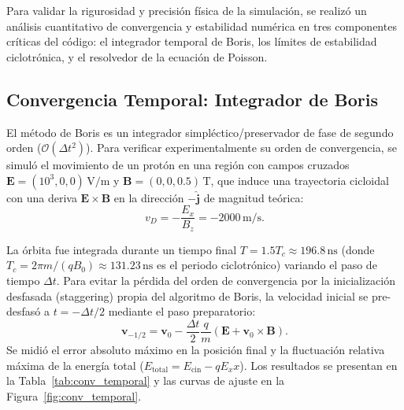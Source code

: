 \documentclass[11pt]{article}
\begin{document}
Para validar la rigurosidad y precisión física de la simulación, se realizó un análisis cuantitativo de convergencia y estabilidad numérica en tres componentes críticas del código: el integrador temporal de Boris, los límites de estabilidad ciclotrónica, y el resolvedor de la ecuación de Poisson.

\subsection{Convergencia Temporal: Integrador de Boris}

El método de Boris es un integrador simpléctico/preservador de fase de segundo orden ($\mathcal{O}(\Delta t^2)$). Para verificar experimentalmente su orden de convergencia, se simuló el movimiento de un protón en una región con campos cruzados $\mathbf{E} = (10^3, 0, 0)\,\text{V/m}$ y $\mathbf{B} = (0, 0, 0.5)\,\text{T}$, que induce una trayectoria cicloidal con una deriva $\mathbf{E} \times \mathbf{B}$ en la dirección $-\hat{\mathbf{j}}$ de magnitud teórica:
\begin{equation}
  v_D = -\frac{E_x}{B_z} = -2000\,\text{m/s}.
\end{equation}

La órbita fue integrada durante un tiempo final $T = 1.5 T_c \approx 196.8\,\text{ns}$ (donde $T_c = 2\pi m / (q B_0) \approx 131.23\,\text{ns}$ es el periodo ciclotrónico) variando el paso de tiempo $\Delta t$. Para evitar la pérdida del orden de convergencia por la inicialización desfasada (staggering) propia del algoritmo de Boris, la velocidad inicial se pre-desfasó a $t = -\Delta t/2$ mediante el paso preparatorio:
\begin{equation}
  \mathbf{v}_{-1/2} = \mathbf{v}_0 - \frac{\Delta t}{2} \frac{q}{m} \left( \mathbf{E} + \mathbf{v}_0 \times \mathbf{B} \right).
\end{equation}
Se midió el error absoluto máximo en la posición final y la fluctuación relativa máxima de la energía total ($E_{\text{total}} = E_{\text{cin}} - q E_x x$). Los resultados se presentan en la Tabla~\ref{tab:conv_temporal} y las curvas de ajuste en la Figura~\ref{fig:conv_temporal}.
\end{document}
